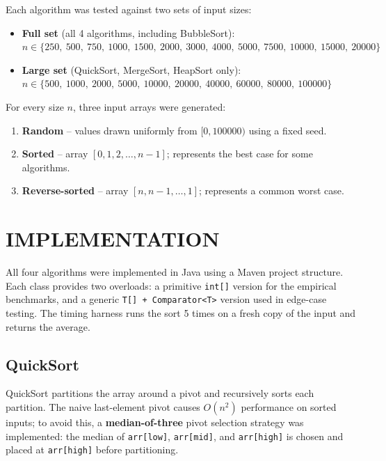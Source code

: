 \documentclass[12pt]{article}
\begin{document}
\hspace{0.8cm} Each algorithm was tested against two sets of input sizes:

\begin{itemize}
  \item \textbf{Full set} (all 4 algorithms, including BubbleSort):\\
        $n \in \{250,\ 500,\ 750,\ 1000,\ 1500,\ 2000,\ 3000,\ 4000,\ 5000,\ 7500,\ 10000,\ 15000,\ 20000\}$

  \item \textbf{Large set} (QuickSort, MergeSort, HeapSort only):\\
        $n \in \{500,\ 1000,\ 2000,\ 5000,\ 10000,\ 20000,\ 40000,\ 60000,\ 80000,\ 100000\}$
\end{itemize}

For every size $n$, three input arrays were generated:

\begin{enumerate}
  \item \textbf{Random} -- values drawn uniformly from $[0, 100000)$ using a fixed seed.
  \item \textbf{Sorted} -- array $[0, 1, 2, \ldots, n-1]$; represents the best case for some algorithms.
  \item \textbf{Reverse-sorted} -- array $[n, n-1, \ldots, 1]$; represents a common worst case.
\end{enumerate}

\section*{IMPLEMENTATION}

\hspace{0.8cm} All four algorithms were implemented in Java using a Maven project structure.
Each class provides two overloads: a primitive \texttt{int[]} version for the empirical benchmarks,
and a generic \texttt{T[] + Comparator<T>} version used in edge-case testing.
The timing harness runs the sort 5 times on a fresh copy of the input and returns the average.

\subsection*{QuickSort}

\hspace{0.8cm} QuickSort partitions the array around a pivot and recursively sorts each partition.
The naive last-element pivot causes $O(n^2)$ performance on sorted inputs; to avoid this,
a \textbf{median-of-three} pivot selection strategy was implemented: the median of
\texttt{arr[low]}, \texttt{arr[mid]}, and \texttt{arr[high]} is chosen and placed at
\texttt{arr[high]} before partitioning.
\end{document}
